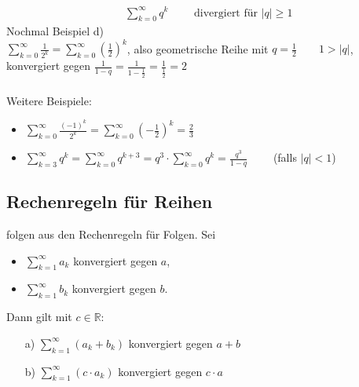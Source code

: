 \documentclass[12pt, titlepage]{article}
\newcommand{\R}{\mathds{R}}
\renewcommand{\>}{\rightarrow}
\renewcommand{\*}{\cdot}
\begin{document}
\begin{itemize}
\begin{align*}
			&\sum_{k=0}^{\infty}q^k\qquad\textrm{ divergiert für }|q|\geq 1
		\end{align*}
		Nochmal Beispiel d)\\
		$\sum_{k=0}^{\infty}\frac{1}{2^k}=\sum_{k=0}^{\infty}(\frac{1}{2})^k$, also geometrische Reihe mit $q=\frac{1}{2}\qquad1>|q|$, konvergiert gegen $\frac{1}{1-q}=\frac{1}{1-\frac{1}{2}}=\frac{1}{\frac{1}{2}}=2$\\
		\\
		Weitere Beispiele:
		\begin{itemize}
			\item $\sum_{k=0}^{\infty}\frac{(-1)^k}{2^k}=\sum_{k=0}^{\infty}(-\frac{1}{2})^k=\frac{2}{3}$
			\item $\sum_{k=3}^{\infty}q^k=\sum_{k=0}^{\infty}q^{k+3}=q^3\*\sum_{k=0}^{\infty}q^k=\frac{q^3}{1-q}\qquad$ (falls $|q|<1$)
		\end{itemize}
	\end{itemize}
		\subsection{Rechenregeln für Reihen}
		folgen aus den Rechenregeln für Folgen. Sei
		\begin{itemize}
			\item $\sum_{k=1}^{\infty}a_k$ konvergiert gegen $a$,
			\item $\sum_{k=1}^{\infty}b_k$ konvergiert gegen $b$.
		\end{itemize}
		Dann gilt mit $c\in\R$:
		\begin{itemize}
			\item[a)] $\sum_{k=1}^{\infty}(a_k+b_k)$ konvergiert gegen $a+b$
			\item[b)] $\sum_{k=1}^{\infty}(c\*a_k)$ konvergiert gegen $c\*a$
		\end{itemize}
\end{document}
